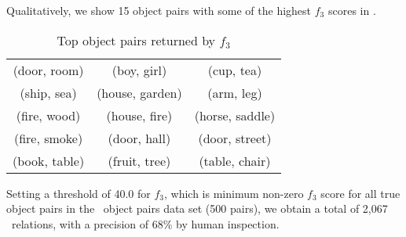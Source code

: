 Qualitatively, we show 15 object pairs with some of the highest $f_3$ scores
in .

\begin{table}[th]
\small
	\centering
	\begin{tabular}{|ccc|}
		\hline
		(door, room)  & (boy, girl)     & (cup, tea)      \\
		(ship, sea)   & (house, garden) & (arm, leg)      \\
		(fire, wood)  & (house, fire)   & (horse, saddle) \\
		(fire, smoke) & (door, hall)    & (door, street)  \\
		(book, table) & (fruit, tree)   & (table, chair)  \\ \hline
	\end{tabular}
	\caption{Top object pairs returned by $f_3$}
	\label{tbl:toppairs}
\end{table}

Setting a threshold of 40.0 for $f_3$, which is minimum non-zero
$f_3$ score for all true object pairs in the \lnear\ object pairs 
data set (500 pairs), we obtain a total of 2,067 \lnear\ relations, with
a precision of 68\% by human inspection.


